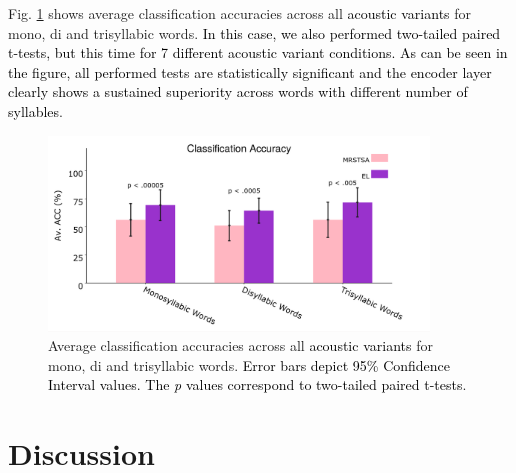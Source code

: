 \documentclass[10pt,letterpaper]{article}
\newcommand{\newreview}[1]{\textcolor{airforceblue}{#1}}
\newcommand{\reviewertwo}[1]{\textcolor{black}{#1}}
\begin{document}
Fig. \ref{fig:AV_ACC} shows average classification accuracies across all \reviewertwo{acoustic variants} for mono, di and trisyllabic words.
\reviewertwo{In this case, we also performed \newreview{two-tailed} paired t-tests, but this time for 7 different acoustic variant conditions.
As can be seen in the figure, all performed tests are statistically significant and the encoder layer clearly shows
a sustained superiority across words with different number of syllables}.
 

\begin{figure}[h!]
    \centering
    \includegraphics[width=0.9\textwidth]{PLOT1.png}
    \caption{Average classification accuracies across all \reviewertwo{acoustic variants} for mono, di and trisyllabic words. \reviewertwo{Error bars depict 95\% Confidence Interval values. The \emph{p} values correspond to \newreview{two-tailed} paired t-tests}.}
    \label{fig:AV_ACC}
\end{figure}














\section*{Discussion}
\end{document}
